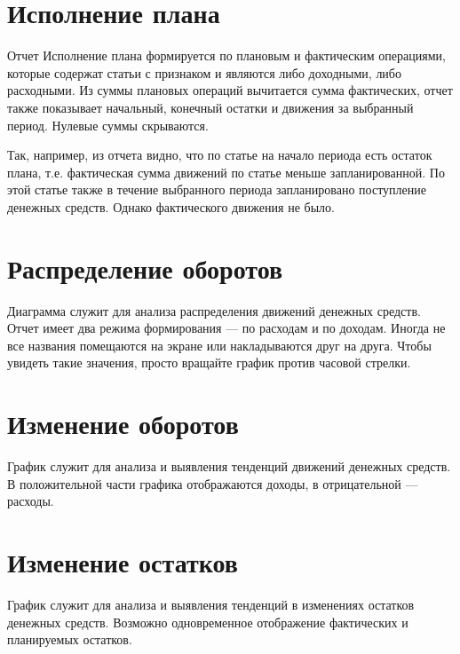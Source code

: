 \documentclass[a4paper,10pt,russian]{sphinxmanual}
\begin{document}
\section{Исполнение плана}
\label{\detokenize{reports:id8}}
Отчет Исполнение плана формируется по плановым и фактическим операциями, которые содержат статьи с
признаком  и являются либо доходными, либо расходными. Из суммы плановых операций вычитается
сумма фактических, отчет также показывает начальный, конечный остатки и движения за выбранный период.
Нулевые суммы скрываются.

Так, например, из отчета видно, что по статье  на начало периода есть остаток плана, т.е. фактическая сумма
движений по статье  меньше запланированной. По этой статье также в течение выбранного периода запланировано
поступление денежных средств. Однако фактического движения не было.

\noindent{}

\noindent{}

\noindent{}


\section{Распределение оборотов}
\label{\detokenize{reports:id9}}
Диаграмма служит для анализа распределения движений денежных средств. Отчет имеет два режима формирования —
по расходам и по доходам. Иногда не все названия помещаются на экране или накладываются друг на друга. Чтобы
увидеть такие значения, просто вращайте график против часовой стрелки.


\section{Изменение оборотов}
\label{\detokenize{reports:id10}}
График служит для анализа и выявления тенденций движений денежных средств. В положительной части графика отображаются доходы,
в отрицательной — расходы.


\section{Изменение остатков}
\label{\detokenize{reports:id11}}
График служит для анализа и выявления тенденций в изменениях остатков денежных средств. Возможно одновременное отображение
фактических и планируемых остатков.
\end{document}
